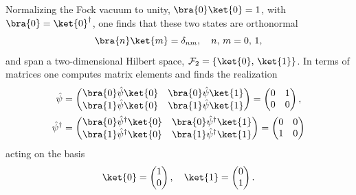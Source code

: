 Normalizing the Fock vacuum to unity, \(\bra{0}\ket{0} = 1\), with \(\bra{0} = \ket{0}^{\dagger}\), one finds that these two states are orthonormal
\[
    \bra{n}\ket{m} = \delta_{nm}, \quad n,\,m = 0,\,1,
\]
and span a two-dimensional Hilbert space, \(\mathcal{F}_2 = \left\{ \ket{0},\,\ket{1} \right\}\). In terms of matrices one computes matrix elements and finds the realization
\[
    \begin{aligned}
        \hat{\psi}           & = \begin{pmatrix}
                                     \bra{0}\hat{\psi}\ket{0} & \bra{0}\hat{\psi}\ket{1} \\
                                     \bra{1}\hat{\psi}\ket{0} & \bra{1}\hat{\psi}\ket{1}
                                 \end{pmatrix} = \begin{pmatrix}
                                                     0 & 1 \\
                                                     0 & 0
                                                 \end{pmatrix},                     \\
        \hat{\psi}^{\dagger} & = \begin{pmatrix}
                                     \bra{0}\hat{\psi}^{\dagger}\ket{0} & \bra{0}\hat{\psi}^{\dagger}\ket{1} \\
                                     \bra{1}\hat{\psi}^{\dagger}\ket{0} & \bra{1}\hat{\psi}^{\dagger}\ket{1}
                                 \end{pmatrix} = \begin{pmatrix}
                                                     0 & 0 \\
                                                     1 & 0
                                                 \end{pmatrix}
    \end{aligned}
\]
acting on the basis
\[
    \ket{0} = \begin{pmatrix}
        1 \\
        0
    \end{pmatrix}, \quad \ket{1} = \begin{pmatrix}
        0 \\
        1
    \end{pmatrix}.
\]

